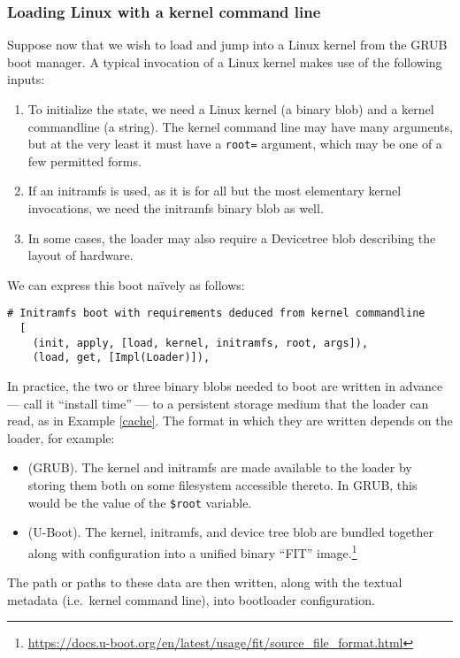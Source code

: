 \subsubsection{Loading Linux with a kernel command line} \label{linux-boot}

Suppose now that we wish to load and jump into a Linux kernel from the GRUB boot manager.
%
A typical invocation of a Linux kernel makes use of the following inputs:
%
\begin{enumerate}
\item
  To initialize the state, we need a Linux kernel (a binary blob) and a kernel commandline (a string). 
  The kernel command line may have many arguments, but at the very least it must have a \texttt{root=} argument, which may be one of a few permitted forms.

\item
  If an initramfs is used, as it is for all but the most elementary kernel invocations, we need the initramfs binary blob as well.

\item
  In some cases, the loader may also require a Devicetree blob describing the layout of hardware.
\end{enumerate}
%
We can express this boot na\"ively as follows:
\begin{lstlisting}[name=grub]
  # Initramfs boot with requirements deduced from kernel commandline
  [
    (init, apply, [load, kernel, initramfs, root, args]),
    (load, get, [Impl(Loader)]),
  \end{lstlisting}

In practice, the two or three binary blobs needed to boot are written in advance --- call it ``install time'' --- to a persistent storage medium that the loader can read, as in Example \ref{cache}.
%
The format in which they are written depends on the loader, for example:
%
\begin{itemize}
  \item 
    (GRUB). The kernel and initramfs are made available to the loader by storing them both on some filesystem accessible thereto. In GRUB, this would be the value of the \texttt{\$root} variable.

  \item
    (U-Boot). The kernel, initramfs, and device tree blob are bundled together along with configuration into a unified binary ``FIT'' image.\footnote{\url{https://docs.u-boot.org/en/latest/usage/fit/source_file_format.html}}
\end{itemize}
%
The path or paths to these data are then written, along with the textual metadata (i.e.~kernel command line), into bootloader configuration.

